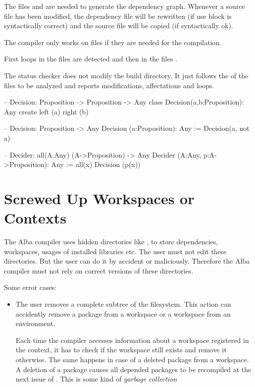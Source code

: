 The files  and  are needed to
generate the dependency graph. Whenever a source file has been modified, the
dependency file will be rewritten (if use block is syntactically correct) and
the source file will be copied (if syntactically ok).

The compiler only works on files if they are needed for the compilation.

First loops in the files  are detected and then in the
files .


The status checker does not modify the build directory. It just follows the
 of the files to be analyzed and reports modifications,
affectations and loops.

\begin{alba}
  -- Decision: Proposition -> Proposition -> Any
  class
    Decision(a,b:Proposition): Any
  create
    left  (a)
    right (b)

  -- Decision: Proposition -> Any
  Decision (a:Proposition): Any
    := Decision(a, not a)

  -- Decider: all(A:Any) (A->Proposition) -> Any
  Decider (A:Any, p:A->Proposition): Any
    := all(x) Decision (p(x))
\end{alba}


\section{Screwed Up Workspaces or Contexts}

The Alba compiler uses hidden directories like ,
 to store dependencies, workspaces, usages of installed
libraries etc. The user must not edit these directories. But the user can do
it by accident or maliciously. Therefore the Alba compiler must not rely on
correct versions of these directories.

Some error cases:
\begin{itemize}

\item The user removes a complete subtree of the filesystem. This action can
  accidently remove a package from a workspace or a workspace from an
  environment.

  Each time the compiler accesses information about a workspace registered in
  the context, it has to check if the workspace still exists and remove it
  otherwise. The same happens in case of a deleted package from a workspace. A
  deletion of a package causes all depended packages to be recompiled at the
  next issue of . This is some kind of \emph{garbage
    collection}


\end{itemize}



